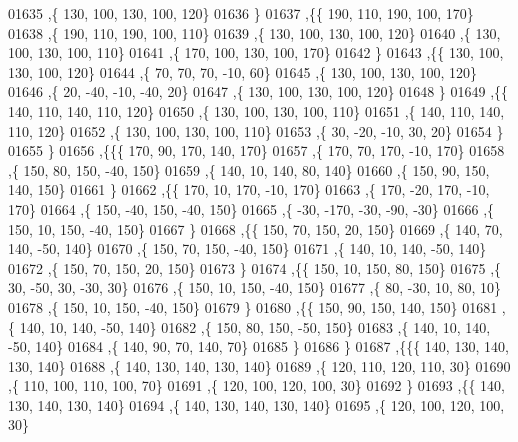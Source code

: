 \begin{DoxyCode}
01635     ,\{   130,   100,   130,   100,   120\}
01636     \}
01637    ,\{\{   190,   110,   190,   100,   170\}
01638     ,\{   190,   110,   190,   100,   110\}
01639     ,\{   130,   100,   130,   100,   120\}
01640     ,\{   130,   100,   130,   100,   110\}
01641     ,\{   170,   100,   130,   100,   170\}
01642     \}
01643    ,\{\{   130,   100,   130,   100,   120\}
01644     ,\{    70,    70,    70,   -10,    60\}
01645     ,\{   130,   100,   130,   100,   120\}
01646     ,\{    20,   -40,   -10,   -40,    20\}
01647     ,\{   130,   100,   130,   100,   120\}
01648     \}
01649    ,\{\{   140,   110,   140,   110,   120\}
01650     ,\{   130,   100,   130,   100,   110\}
01651     ,\{   140,   110,   140,   110,   120\}
01652     ,\{   130,   100,   130,   100,   110\}
01653     ,\{    30,   -20,   -10,    30,    20\}
01654     \}
01655    \}
01656   ,\{\{\{   170,    90,   170,   140,   170\}
01657     ,\{   170,    70,   170,   -10,   170\}
01658     ,\{   150,    80,   150,   -40,   150\}
01659     ,\{   140,    10,   140,    80,   140\}
01660     ,\{   150,    90,   150,   140,   150\}
01661     \}
01662    ,\{\{   170,    10,   170,   -10,   170\}
01663     ,\{   170,   -20,   170,   -10,   170\}
01664     ,\{   150,   -40,   150,   -40,   150\}
01665     ,\{   -30,  -170,   -30,   -90,   -30\}
01666     ,\{   150,    10,   150,   -40,   150\}
01667     \}
01668    ,\{\{   150,    70,   150,    20,   150\}
01669     ,\{   140,    70,   140,   -50,   140\}
01670     ,\{   150,    70,   150,   -40,   150\}
01671     ,\{   140,    10,   140,   -50,   140\}
01672     ,\{   150,    70,   150,    20,   150\}
01673     \}
01674    ,\{\{   150,    10,   150,    80,   150\}
01675     ,\{    30,   -50,    30,   -30,    30\}
01676     ,\{   150,    10,   150,   -40,   150\}
01677     ,\{    80,   -30,    10,    80,    10\}
01678     ,\{   150,    10,   150,   -40,   150\}
01679     \}
01680    ,\{\{   150,    90,   150,   140,   150\}
01681     ,\{   140,    10,   140,   -50,   140\}
01682     ,\{   150,    80,   150,   -50,   150\}
01683     ,\{   140,    10,   140,   -50,   140\}
01684     ,\{   140,    90,    70,   140,    70\}
01685     \}
01686    \}
01687   ,\{\{\{   140,   130,   140,   130,   140\}
01688     ,\{   140,   130,   140,   130,   140\}
01689     ,\{   120,   110,   120,   110,    30\}
01690     ,\{   110,   100,   110,   100,    70\}
01691     ,\{   120,   100,   120,   100,    30\}
01692     \}
01693    ,\{\{   140,   130,   140,   130,   140\}
01694     ,\{   140,   130,   140,   130,   140\}
01695     ,\{   120,   100,   120,   100,    30\}

\end{DoxyCode}
